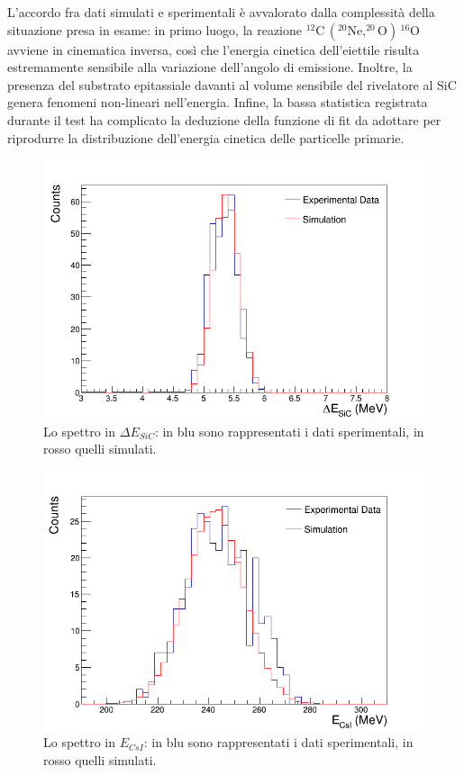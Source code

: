 L'accordo fra dati simulati e sperimentali è avvalorato dalla complessità della situazione presa in esame: in primo luogo, la reazione $^{12}\mbox{C}\,  ( ^{20}\mbox{Ne}, ^{20}\mbox{O} ) \, ^{16}\mbox{O} $ avviene in cinematica inversa, così che l'energia cinetica dell'eiettile risulta estremamente sensibile alla variazione dell'angolo di emissione.
Inoltre, la presenza del substrato epitassiale davanti al volume sensibile del rivelatore al SiC genera fenomeni non-lineari nell'energia.
Infine, la bassa statistica registrata durante il test ha complicato la deduzione della funzione di fit da adottare per riprodurre la distribuzione dell'energia cinetica delle particelle primarie.



\begin{figure} [!p]
	\centering
	\includegraphics[width=\textwidth, keepaspectratio]{Grafici_Tesi/Test/spettro_sic.png}
	\caption{Lo spettro in $\Delta E_{SiC}$: in blu sono rappresentati i dati sperimentali, in rosso quelli simulati.} \label{fig:spettro_sic}
\end{figure}



\begin{figure} [!p]
	\centering
	\includegraphics[width=\textwidth, keepaspectratio]{Grafici_Tesi/Test/spettro_csi.png}
	\caption{Lo spettro in $E_{CsI}$: in blu sono rappresentati i dati sperimentali, in rosso quelli simulati.} \label{fig:spettro_csi_simul}
\end{figure}


